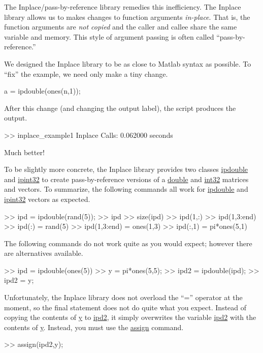 \documentclass[12pt]{article}
\newcommand{\mycmd}[1]{\url{#1}}
\begin{document}
The Inplace/pass-by-reference library remedies this inefficiency.  The Inplace library allows us to makes changes to function arguments \emph{in-place}.  That is, the function arguments are \emph{not copied} and the caller and callee share the same variable and memory.  This style of argument passing is often called ``pass-by-reference.''

We designed the Inplace library to be as close to Matlab syntax as possible.  To ``fix'' the example, we need only make a tiny change.
\begin{mcode}
a = ipdouble(ones(n,1));
\end{mcode}
After this change (and changing the output label), the script produces the output.
\begin{mcode} 
>> inplace_example1
Inplace Calls: 0.062000 seconds
\end{mcode}
Much better!

To be slightly more concrete, the Inplace library provides two classes \mycmd{ipdouble} and \mycmd{ipint32} to create pass-by-reference versions of a \mycmd{double} and \mycmd{int32} matrices and vectors.  To summarize, the following commands all work for \mycmd{ipdouble} and \mycmd{ipint32} vectors as expected.

\begin{mcode}
>> ipd = ipdouble(rand(5)); 
>> ipd                           %
>> size(ipd)                     %
>> ipd(1,:)                      %
>> ipd(1,3:end)                  %
>> ipd(:) = rand(5)              %
>> ipd(1,3:end) = ones(1,3)      %
>> ipd(:,1) = pi*ones(5,1)       %
\end{mcode}

The following commands do not work quite as you would expect; however there are alternatives available.  
\begin{mcode}
>> ipd = ipdouble(ones(5)) %
>> y = pi*ones(5,5);       %
>> ipd2 = ipdouble(ipd);   %
>> ipd2 = y;               %
\end{mcode}
Unfortunately, the Inplace library does not overload the ``='' operator at the moment, so the final statement does not do quite what you expect.  Instead of copying the contents of \mycmd{y} to \mycmd{ipd2}, it simply overwrites the variable \mycmd{ipd2} with the contents of \mycmd{y}.
Instead, you must use the \mycmd{assign} command.
\begin{mcode}
>> assign(ipd2,y);        %
\end{mcode}
\end{document}
